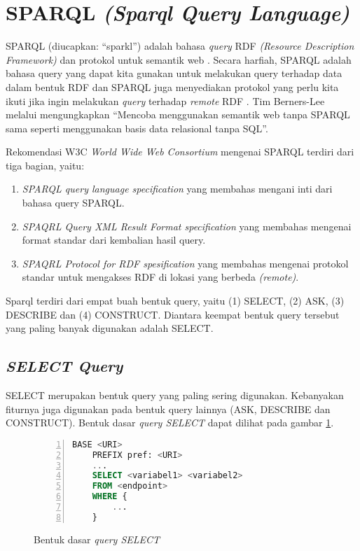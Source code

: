 \section{SPARQL \emph{(Sparql Query Language)}}
SPARQL (diucapkan: ``sparkl'') adalah bahasa \emph{query} RDF \emph{(Resource Description Framework)} dan protokol untuk semantik web \citep{liyang_yu}. Secara harfiah, SPARQL adalah bahasa query yang dapat kita gunakan untuk melakukan query terhadap data dalam bentuk RDF dan SPARQL juga menyediakan protokol yang perlu kita ikuti jika ingin melakukan \emph{query} terhadap \emph{remote} RDF \citep{liyang_yu}. Tim Berners-Lee melalui \citet{ducharme} mengungkapkan ``Mencoba menggunakan semantik web tanpa SPARQL sama seperti menggunakan basis data relasional tanpa SQL''.

Rekomendasi W3C \emph{World Wide Web Consortium} mengenai SPARQL terdiri dari tiga bagian, yaitu:

\begin{enumerate}
	\item \emph{SPARQL query language specification} yang membahas mengani inti dari bahasa query SPARQL.
	\item \emph{SPAQRL Query XML Result Format specification} yang membahas mengenai format standar dari kembalian hasil query.
	\item \emph{SPAQRL Protocol for RDF spesification} yang membahas mengenai protokol standar untuk mengakses RDF di lokasi yang berbeda \emph{(remote)}.
\end{enumerate}

Sparql terdiri dari empat buah bentuk query, yaitu (1) SELECT, (2) ASK, (3) DESCRIBE dan (4) CONSTRUCT. Diantara keempat bentuk query tersebut yang paling banyak digunakan adalah SELECT.

\subsection{\emph{SELECT Query}}
SELECT merupakan bentuk query yang paling sering digunakan. Kebanyakan fiturnya juga digunakan pada bentuk query lainnya (ASK, DESCRIBE dan CONSTRUCT). Bentuk dasar \emph{query SELECT} dapat dilihat pada gambar \ref{fig:bentuk_query_select}.
\begin{figure}[b]
	\centering
	\begin{lstlisting}[language=SQL, xleftmargin=15pt, numbers=left]
 	BASE <URI>
 	PREFIX pref: <URI>
 	...
 	SELECT <variabel1> <variabel2>
 	FROM <endpoint>
 	WHERE {
 		...
 	}\end{lstlisting} 
	\caption{Bentuk dasar \emph{query SELECT} \citep{liyang_yu}}
	\label{fig:bentuk_query_select}
\end{figure}

